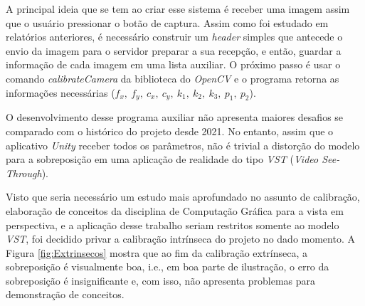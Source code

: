 A principal ideia que se tem ao criar esse sistema é receber uma imagem assim que o usuário pressionar o botão de captura. Assim como foi estudado em relatórios anteriores, é necessário construir um \textit{header} simples que antecede o envio da imagem para o servidor preparar a sua recepção, e então, guardar a informação de cada imagem em uma lista auxiliar. O próximo passo é usar o comando \textit{calibrateCamera} da biblioteca do \textit{OpenCV} e o programa retorna as informações necessárias (\(f_x, \ f_y, \ c_x, \ c_y, \ k_1, \ k_2, \ k_3, \ p_1, \ p_2\)).

O desenvolvimento desse programa auxiliar não apresenta maiores desafios se comparado com o histórico do projeto desde 2021. No entanto, assim que o aplicativo \textit{Unity} receber todos os parâmetros, não é trivial a distorção do modelo para a sobreposição em uma aplicação de realidade do tipo \textit{VST} (\textit{Video See-Through}).

Visto que seria necessário um estudo mais aprofundado no assunto de calibração, elaboração de conceitos da disciplina de Computação Gráfica para a vista em perspectiva, e a aplicação desse trabalho seriam restritos somente ao modelo \textit{VST}, foi decidido privar a calibração intrínseca do projeto no dado momento. A Figura \ref{fig:Extrinsecos} mostra que ao fim da calibração extrínseca, a sobreposição é visualmente boa, i.e., em boa parte de ilustração, o erro da sobreposição é insignificante e, com isso, não apresenta problemas para demonstração de conceitos.